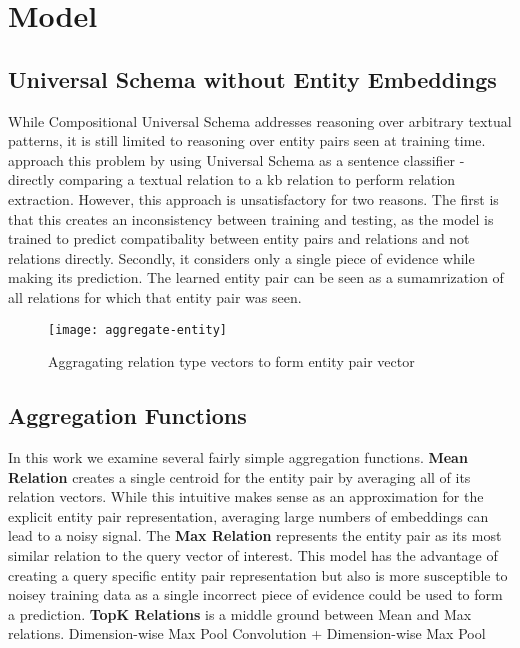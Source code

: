 \section{Model \label{sec:model}}

\subsection {Universal Schema without Entity Embeddings}

While Compositional Universal Schema addresses reasoning over arbitrary textual patterns, it is still limited to reasoning over entity pairs seen at training time.
\citet{verga2015multilingual} approach this problem by using Universal Schema as a sentence classifier - directly comparing a textual relation to a kb relation to perform relation extraction.
However, this approach is unsatisfactory for two reasons.
The first is that this creates an inconsistency between training and testing, as the model is trained to predict compatibality between entity pairs and relations and not relations directly.
Secondly, it considers only a single piece of evidence while making its prediction.
The learned entity pair can be seen as a sumamrization of all relations for which that entity pair was seen.



\begin{figure}[h]
\caption{Aggragating relation type vectors to form entity pair vector}
\centering
\texttt{[image: aggregate-entity]}
\end{figure}


\subsection {Aggregation Functions \label{sec:functions}}
In this work we examine several fairly simple aggregation functions.
\textbf{Mean Relation} creates a single centroid for the entity pair by averaging all of its relation vectors.
While this intuitive makes sense as an approximation for the explicit entity pair representation, averaging large numbers of embeddings can lead to a noisy signal.
The \textbf{Max Relation} represents the entity pair as its most similar relation to the query vector of interest.
This model has the advantage of creating a query specific entity pair representation but also is more susceptible to noisey training data as a single incorrect piece of evidence could be used to form a prediction.
\textbf {TopK Relations} is a middle ground between Mean and Max relations.
 Dimension-wise Max Pool
   Convolution + Dimension-wise Max Pool

